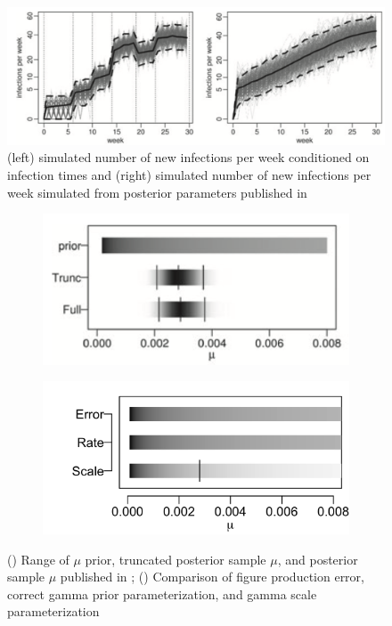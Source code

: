 \documentclass{uwstat572}
\begin{document}
\begin{figure}[H]
\centering
\includegraphics[height=0.36\linewidth, keepaspectratio]{figures/brown_figure_4.png}
\caption{(left) simulated number of new infections per week conditioned on infection times and (right) simulated number of new infections per week simulated from posterior parameters published in  \citet{Brown} }
\label{fig:post_sim_plot}
\end{figure} 

\begin{figure}[H]
	\centering
	\begin{subfigure}[b]{0.49\textwidth}
		\includegraphics[width=\textwidth]{figures/brown_figure_2a.png}
		\caption{}
		\label{fig:brown2a}
	\end{subfigure}
	\hfill
	\begin{subfigure}[b]{0.49\textwidth}
		\includegraphics[width=\textwidth]{figures/rate_v_scale_plot.png}
		\caption{}
		\label{fig:welch2a}
	\end{subfigure}
	\caption{() Range of $\mu$ prior, truncated posterior sample $\mu$, and posterior sample $\mu$ published in \citet{Brown}; () Comparison of figure production error, correct gamma prior parameterization, and gamma scale parameterization }
	\label{fig:figError}
\end{figure} 
\end{document}
